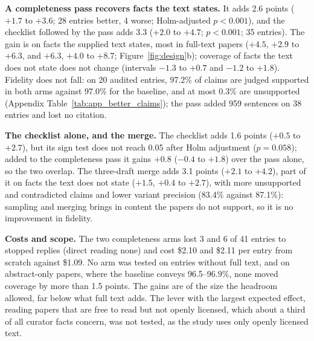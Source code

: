 \documentclass{article} %
\begin{document}
\textbf{A completeness pass recovers facts the text states.} It adds 2.6 points ($+1.7$ to $+3.6$; 28 entries better, 4 worse; Holm-adjusted $p<0.001$), and the checklist followed by the pass adds 3.3 ($+2.0$ to $+4.7$; $p<0.001$; 35 entries). The gain is on facts the supplied text states, most in full-text papers ($+4.5$, $+2.9$ to $+6.3$, and $+6.3$, $+4.0$ to $+8.7$; Figure~\ref{fig:design}b); coverage of facts the text does not state does not change (intervals $-1.3$ to $+0.7$ and $-1.2$ to $+1.8$). Fidelity does not fall: on 20 audited entries, 97.2\% of claims are judged supported in both arms against 97.0\% for the baseline, and at most 0.3\% are unsupported (Appendix Table~\ref{tab:app_better_claims}); the pass added 959 sentences on 38 entries and lost no citation.

\textbf{The checklist alone, and the merge.} The checklist adds 1.6 points ($+0.5$ to $+2.7$), but its sign test does not reach 0.05 after Holm adjustment ($p=0.058$); added to the completeness pass it gains $+0.8$ ($-0.4$ to $+1.8$) over the pass alone, so the two overlap. The three-draft merge adds 3.1 points ($+2.1$ to $+4.2$), part of it on facts the text does not state ($+1.5$, $+0.4$ to $+2.7$), with more unsupported and contradicted claims and lower variant precision (83.4\% against 87.1\%): sampling and merging brings in content the papers do not support, so it is no improvement in fidelity.

\textbf{Costs and scope.} The two completeness arms lost 3 and 6 of 41 entries to stopped replies (direct reading none) and cost \$2.10 and \$2.11 per entry from scratch against \$1.09. No arm was tested on entries without full text, and on abstract-only papers, where the baseline conveys 96.5--96.9\%, none moved coverage by more than 1.5 points. The gains are of the size the headroom allowed, far below what full text adds. The lever with the largest expected effect, reading papers that are free to read but not openly licensed, which about a third of all curator facts concern, was not tested, as the study uses only openly licensed text.
\end{document}
